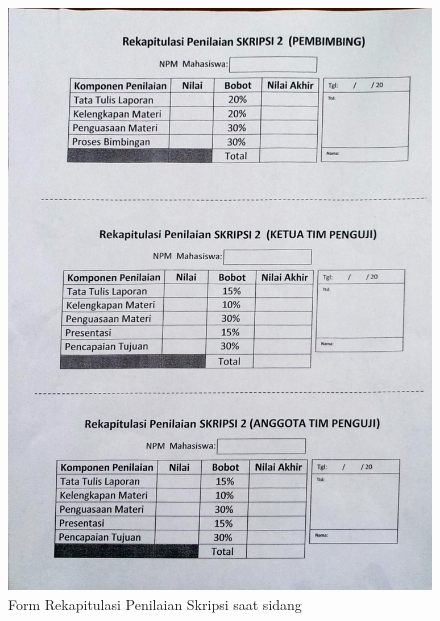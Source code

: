 \begin{figure}[H]
	\centering
	\includegraphics[scale=0.20]{Gambar/dokumen_rekap}
	\caption[Form Rekapitulasi Penilaian Skripsi saat sidang]{Form Rekapitulasi Penilaian Skripsi saat sidang} 
	\label{fig:appxa3}
\end{figure}